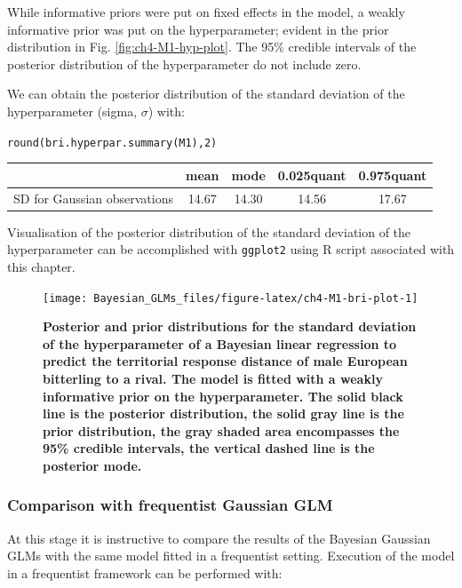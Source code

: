 \documentclass[
]{book}
\begin{document}
While informative priors were put on fixed effects in the model, a weakly informative prior was put on the hyperparameter; evident in the prior distribution in Fig. \ref{fig:ch4-M1-hyp-plot}. The 95\% credible intervals of the posterior distribution of the hyperparameter do not include zero.

We can obtain the posterior distribution of the standard deviation of the hyperparameter (sigma, \(\sigma\)) with:

\texttt{round(bri.hyperpar.summary(M1),2)}

\begin{longtable}[]{@{}ccccc@{}}
\toprule
& mean & mode & 0.025quant & 0.975quant \\
\midrule
\endhead
SD for Gaussian observations & 14.67 & 14.30 & 14.56 & 17.67 \\
\bottomrule
\end{longtable}

Visualisation of the posterior distribution of the standard deviation of the hyperparameter can be accomplished with \texttt{ggplot2} using R script associated with this chapter.



\begin{figure}

{\centering \texttt{[image: Bayesian\_GLMs\_files/figure-latex/ch4-M1-bri-plot-1]} 

}

\caption{\textbf{Posterior and prior distributions for the standard deviation of the hyperparameter of a Bayesian linear regression to predict the territorial response distance of male European bitterling to a rival. The model is fitted with a weakly informative prior on the hyperparameter. The solid black line is the posterior distribution, the solid gray line is the prior distribution, the gray shaded area encompasses the 95\% credible intervals, the vertical dashed line is the posterior mode.}}\label{fig:ch4-M1-bri-plot}
\end{figure}

\hypertarget{comparison-with-frequentist-gaussian-glm}{%
\subsubsection{Comparison with frequentist Gaussian GLM}\label{comparison-with-frequentist-gaussian-glm}}

At this stage it is instructive to compare the results of the Bayesian Gaussian GLMs with the same model fitted in a frequentist setting. Execution of the model in a frequentist framework can be performed with:
\end{document}
